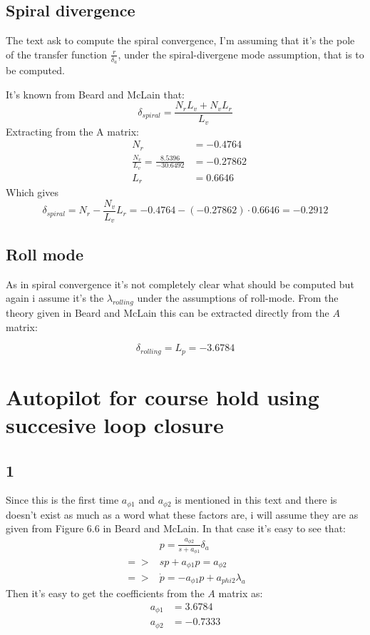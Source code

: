 \documentclass[11pt]{article}
\begin{document}
\subsection{Spiral divergence}
The text ask to compute the spiral convergence, I'm assuming that it's the pole of the transfer function $\frac{r}{\delta_a}$, under the spiral-divergene mode assumption, that is to be computed.

It's known from Beard and McLain that: 
\[\delta_{spiral} = \frac{N_r L_v + N_v L_r}{L_v} \]
Extracting from the A matrix:
\begin{align}
&N_r &= -0.4764 \\
&\frac{N_v}{L_v} = \frac{8.5396}{-30.6492} &= -0.27862 \\
&L_r &= 0.6646
\end{align} 
Which gives
\[\delta_{spiral} = N_r - \frac{N_v}{L_v} L_r = -0.4764 - (- 0.27862) \cdot 0.6646 = -0.2912 \]



\subsection{Roll mode}
As in spiral convergence it's not completely clear what should be computed but again i assume it's the $\lambda_{rolling}$ under the assumptions of roll-mode. From the theory given in Beard and McLain this can be extracted directly from the $A$ matrix:

\[\delta_{rolling} = L_p = -3.6784\]


\section{Autopilot for course hold using succesive loop closure}
\subsection*{1}
Since this is the first time $a_{\phi 1}$ and $a_{\phi 2}$ is mentioned in this text and there is doesn't exist as much as a word what these factors are, i will assume they are as given from Figure 6.6 in Beard and McLain. In that case it's easy to see that:
\begin{align*}
& p = \frac{a_{\phi 2} }{s + a_{\phi 1} } \delta_a \\
=> & sp + a_{\phi 1} p = a_{\phi 2} \\
=> & \dot{p} = -a_{\phi 1} p + a_{phi 2} \lambda_a
\end{align*}
Then it's easy to get the coefficients from the $A$ matrix as:
\begin{align*}
a_{\phi 1} &= 3.6784 \\
a_{\phi 2} &= -0.7333
\end{align*}
\end{document}
